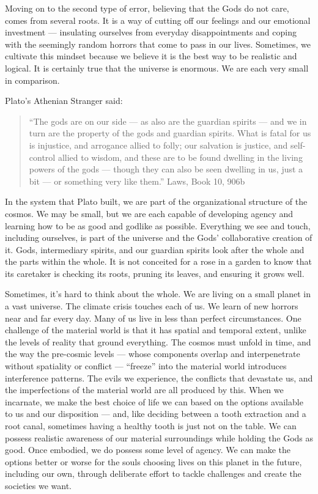 \documentclass[
]{book}
\begin{document}
Moving on to the second type of error, believing that the Gods do not care, comes from several roots. It is a way of cutting off our feelings and our emotional investment --- insulating ourselves from everyday disappointments and coping with the seemingly random horrors that come to pass in our lives. Sometimes, we cultivate this mindset because we believe it is the best way to be realistic and logical. It is certainly true that the universe is enormous. We are each very small in comparison.

Plato's Athenian Stranger said:

\begin{quote}
``The gods are on our side --- as also are the guardian spirits --- and we in turn are the property of the gods and guardian spirits. What is fatal for us is injustice, and arrogance allied to folly; our salvation is justice, and self-control allied to wisdom, and these are to be found dwelling in the living powers of the gods --- though they can also be seen dwelling in us, just a bit --- or something very like them.'' Laws, Book 10, 906b
\end{quote}

In the system that Plato built, we are part of the organizational structure of the cosmos. We may be small, but we are each capable of developing agency and learning how to be as good and godlike as possible. Everything we see and touch, including ourselves, is part of the universe and the Gods' collaborative creation of it. Gods, intermediary spirits, and our guardian spirits look after the whole and the parts within the whole. It is not conceited for a rose in a garden to know that its caretaker is checking its roots, pruning its leaves, and ensuring it grows well.

Sometimes, it's hard to think about the whole. We are living on a small planet in a vast universe. The climate crisis touches each of us. We learn of new horrors near and far every day. Many of us live in less than perfect circumstances. One challenge of the material world is that it has spatial and temporal extent, unlike the levels of reality that ground everything. The cosmos must unfold in time, and the way the pre-cosmic levels --- whose components overlap and interpenetrate without spatiality or conflict --- ``freeze'' into the material world introduces interference patterns. The evils we experience, the conflicts that devastate us, and the imperfections of the material world are all produced by this. When we incarnate, we make the best choice of life we can based on the options available to us and our disposition --- and, like deciding between a tooth extraction and a root canal, sometimes having a healthy tooth is just not on the table. We can possess realistic awareness of our material surroundings while holding the Gods as good. Once embodied, we do possess some level of agency. We can make the options better or worse for the souls choosing lives on this planet in the future, including our own, through deliberate effort to tackle challenges and create the societies we want.
\end{document}
